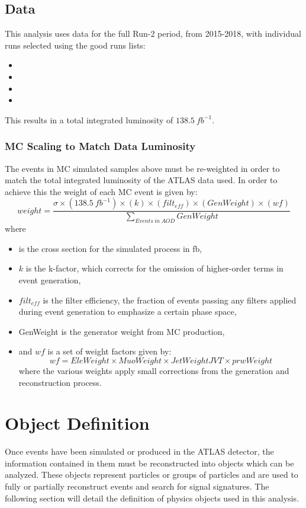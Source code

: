 \subsection{Data}
This analysis uses data for the full Run-2 period, from 2015-2018, with individual runs selected using the good runs lists:
{ \scriptsize
\begin{itemize}
	\item \GRLa
	\item \GRLb
	\item \GRLc
	\item \GRLd
\end{itemize}
}
This results in a total integrated luminosity of $138.5~fb^{-1}$.

\subsubsection{MC Scaling to Match Data Luminosity}
The events in MC simulated samples above must be re-weighted in order to match the total integrated luminosity of the ATLAS data used. In order to achieve this the weight of each MC event is given by:
\begin{equation}
weight  = \frac{ \sigma \times (138.5~fb^{-1}) \times (k) \times (filt_{eff}) \times (GenWeight) \times (wf)}{\sum_{Events~in~AOD} GenWeight }
\end{equation}
where
\begin{itemize}
\item \sigma is the cross section for the simulated process in fb,
\item $k$ is the k-factor, which corrects for the omission of higher-order terms in event generation,
\item $filt_{eff}$ is the filter efficiency, the fraction of events passing any filters applied during event generation to emphasize a certain phase space,
\item GenWeight is the generator weight from MC production,
\item and $wf$ is a set of weight factors given by:
\begin{equation}
wf = EleWeight \times MuoWeight \times JetWeightJVT \times prwWeight
\end{equation}
where the various weights apply small corrections from the generation and reconstruction process.
\end{itemize}


\section{Object Definition}
Once events have been simulated or produced in the ATLAS detector, the information contained in them must be reconstructed into objects which can be analyzed. These objects represent particles or groups of particles and are used to fully or partially reconstruct events and search for signal signatures. The following section will detail the definition of physics objects used in this analysis.

